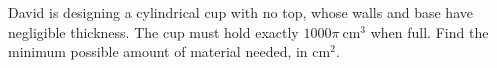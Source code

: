 David is designing a cylindrical cup with no top, whose walls and base have negligible thickness. The cup must hold exactly $1000\pi\ \text{cm}^3$ when full. Find the minimum possible amount of material needed, in $\text{cm}^2$.
